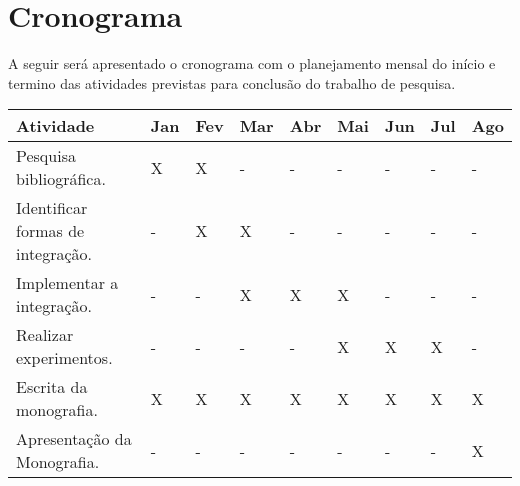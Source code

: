 \section*{Cronograma}
A seguir será apresentado o cronograma com o planejamento mensal do início e termino das atividades previstas para conclusão do trabalho de pesquisa.

\begin{table}[htb]
	\center
	\footnotesize
	\begin{tabular}{|p{5cm}|p{0.8cm}|p{0.8cm}|p{0.8cm}|p{0.8cm}|p{0.8cm}|p{0.8cm}|p{0.8cm}|p{0.8cm}|}
		\hline
		\textbf{Atividade} & \textbf{Jan} & \textbf{Fev} & \textbf{Mar} & \textbf{Abr} & \textbf{Mai} & \textbf{Jun} & \textbf{Jul} & \textbf{Ago} \\
		\hline
		Pesquisa bibliográfica. & X & X & - & - & - & - & - & - \\
		\hline
		Identificar formas de integração. & - & X & X & - & - & - & - & - \\
		\hline
		Implementar a integração. & - & - & X & X & X & - & - & - \\
		\hline
		Realizar experimentos. & - & - & - & - & X & X & X & - \\
		\hline
		Escrita da monografia. & X & X & X & X & X & X & X & X \\
		\hline
		Apresentação da Monografia. & - & - & - & - & - & - & - & X \\		
		\hline
	\end{tabular}
\end{table}

